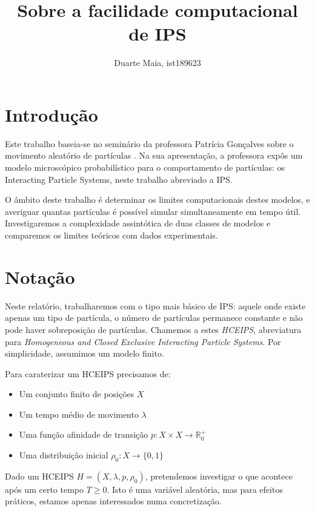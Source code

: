 \documentclass{article}
\title{Sobre a facilidade computacional de IPS}
\author{Duarte Maia, ist189623}
\date{}
\newcommand{\R}{\mathbb{R}}
\begin{document}
	\maketitle

	\section{Introdução}

	Este trabalho baseia-se no seminário da professora Patrícia Gonçalves sobre o movimento aleatório de partículas \cite{pat}. Na sua apresentação, a professora expôs um modelo microscópico probabilístico para o comportamento de partículas: os Interacting Particle Systems, neste trabalho abreviado a IPS.
	
	O âmbito deste trabalho é determinar os limites computacionais destes modelos, e averiguar quantas partículas é possível simular simultaneamente em tempo útil. Investigaremos a complexidade assintótica de duas classes de modelos e comparemos os limites teóricos com dados experimentais.

	\section{Notação}
	
	Neste relatório, trabalharemos com o tipo mais básico de IPS: aquele onde existe apenas um tipo de partícula, o número de partículas permanece constante e não pode haver sobreposição de partículas. Chamemos a estes \emph{HCEIPS}, abreviatura para \emph{Homogeneous and Closed Exclusive Interacting Particle Systems}. Por simplicidade, assumimos um modelo finito.
	
	Para caraterizar um HCEIPS precisamos de:
	
	\begin{itemize}
	\item Um conjunto finito de posições $X$
	
	\item Um tempo médio de movimento $\lambda$
	
	\item Uma função afinidade de transição $p : X \times X \rightarrow \R^+_0$
	
	\item Uma distribuição inicial $\rho_0 : X \rightarrow \{0,1\}$
	\end{itemize}
	
	Dado um HCEIPS $H = (X, \lambda, p, \rho_0)$, pretendemos investigar o que acontece após um certo tempo $T \geq 0$. Isto é uma variável aleatória, mas para efeitos práticos, estamos apenas interessados numa concretização.
	
\end{document}
